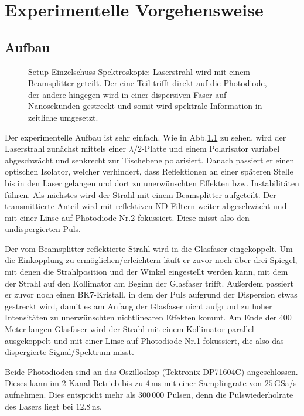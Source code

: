\documentclass[bachelor,       %
               twoside,        %
               BCOR10mm,       %
               english,ngerman, %
               ]{GAUBM}
\begin{document}
\chapter{Experimentelle Vorgehensweise}
\section{Aufbau}
\begin{figure}[!htb]
	\centering
	\def\svgwidth{\columnwidth}
	
	\caption{Setup Einzelschuss-Spektroskopie: Laserstrahl wird mit einem Beamsplitter geteilt. Der eine Teil trifft direkt auf die Photodiode, der andere hingegen wird in einer dispersiven Faser auf Nanosekunden gestreckt und somit wird spektrale Information  in zeitliche  umgesetzt.}
	\label{fig:DFTSetup}
\end{figure}
Der experimentelle Aufbau ist sehr einfach.
Wie in Abb.\ref{fig:DFTSetup} zu sehen, wird der Laserstrahl zunächst mittels einer $\lambda/2$-Platte und einem Polarisator variabel abgeschwächt und senkrecht zur Tischebene polarisiert.
Danach passiert er einen optischen Isolator, welcher verhindert, dass Reflektionen an einer späteren Stelle bis in den Laser gelangen und dort zu unerwünschten Effekten bzw. Instabilitäten führen.
Als nächstes wird der Strahl mit einem Beamsplitter aufgeteilt.
Der transmittierte Anteil wird mit reflektiven ND-Filtern weiter abgeschwächt und mit einer Linse auf Photodiode Nr.2 fokussiert.
Diese misst also den undispergierten Puls.

Der vom Beamsplitter reflektierte Strahl wird in die Glasfaser eingekoppelt.
Um die Einkopplung zu ermöglichen/erleichtern läuft er zuvor noch über drei Spiegel, mit denen die Strahlposition und der Winkel eingestellt werden kann, mit dem der Strahl auf den Kollimator am Beginn der Glasfaser trifft.
Außerdem passiert er zuvor noch einen BK7-Kristall, in dem der Puls aufgrund der Dispersion etwas gestreckt wird, damit es am Anfang der Glasfaser nicht aufgrund zu hoher Intensitäten zu unerwünschten nichtlinearen Effekten kommt.
Am Ende der 400 Meter langen Glasfaser wird der Strahl mit einem Kollimator parallel ausgekoppelt und mit einer Linse auf Photodiode Nr.1 fokussiert, die also das dispergierte Signal/Spektrum misst.

Beide Photodioden sind an das Oszilloskop (Tektronix DP71604C) angeschlossen.
Dieses kann im 2-Kanal-Betrieb bis zu $4\,$ms mit einer Samplingrate von $25\,$GSa/s aufnehmen.
Dies entspricht mehr als 300\,000 Pulsen, denn die Pulswiederholrate des Lasers liegt bei $12.8\,$ns.
\end{document}

